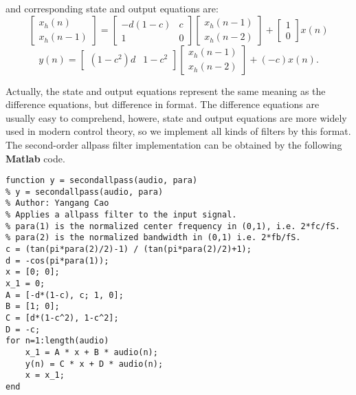 \documentclass[10pt,a4paper,oneside]{article}
\begin{document}
and corresponding state and output equations are:
\[
\begin{bmatrix}x_h(n)\\x_h(n-1)\end{bmatrix} = \begin{bmatrix}
-d(1-c)&c\\
1&0
\end{bmatrix}
\begin{bmatrix}x_h(n-1)\\x_h(n-2)\end{bmatrix} + \begin{bmatrix}1\\0\end{bmatrix}
x(n)\]
\[
y(n) = \begin{bmatrix}(1-c^2)d&1-c^2\end{bmatrix}
\begin{bmatrix}x_h(n-1)\\x_h(n-2)\end{bmatrix} + (-c)x(n).
\]

Actually, the state and output equations represent the same meaning as the difference equations, but difference in format. The difference equations are usually easy to comprehend, howere, state and output equations are more widely used in modern control theory, so we implement all kinds of filters by this format. The second-order allpass filter implementation can be obtained by the following {\bfseries Matlab} code.
\begin{lstlisting}
function y = secondallpass(audio, para)
% y = secondallpass(audio, para)
% Author: Yangang Cao
% Applies a allpass filter to the input signal.
% para(1) is the normalized center frequency in (0,1), i.e. 2*fc/fS.
% para(2) is the normalized bandwidth in (0,1) i.e. 2*fb/fS.
c = (tan(pi*para(2)/2)-1) / (tan(pi*para(2)/2)+1);
d = -cos(pi*para(1));
x = [0; 0];
x_1 = 0;
A = [-d*(1-c), c; 1, 0];
B = [1; 0];
C = [d*(1-c^2), 1-c^2];
D = -c;
for n=1:length(audio)
	x_1 = A * x + B * audio(n);
	y(n) = C * x + D * audio(n);
	x = x_1;
end
\end{lstlisting}
\end{document}
